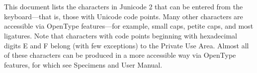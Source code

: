 \documentclass[12pt,letterpaper,openany]{book}
\begin{document}
\begin{titlepage}
\huge\noindent
{\color{myRed}}\\[5cm]
\Huge{} \\[1cm]
\huge{} \\[1cm]
\Huge{} \\[1cm]
\huge{} \\[1ex]
\Large{}\\
\vfill
{\color{myRed}}
\end{titlepage}
\mainmatter
{}

{\noindent\semiexpanded This document lists the characters in Junicode 2 that can be entered
from the keyboard—that is, those with Unicode code points. Many other
characters are accessible via OpenType features—for example, small
caps, petite caps, and most ligatures. Note that characters with code
points beginning with hexadecimal digits E and F belong (with few exceptions) to the Private
Use Area. Almost all of these characters can be produced in a more
accessible way via
OpenType features, for which see {\semiexpandeditalic Specimens and User
  Manual}.}
\end{document}
